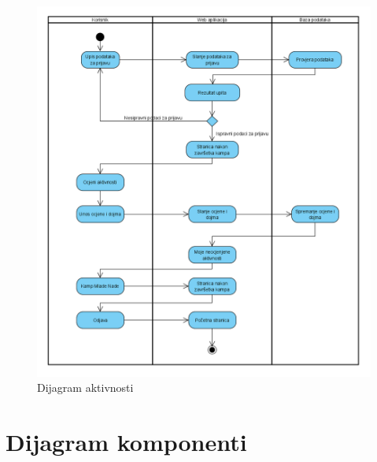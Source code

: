 \begin{figure}[htb]
	\centering
	\includegraphics[scale=0.5]{dijagrami/dijagramAktivnosti.PNG}
	\caption{Dijagram aktivnosti}
	\label{fig: dijagram aktivnosti}
\end{figure}

		\eject
		
	\section{Dijagram komponenti}
	
